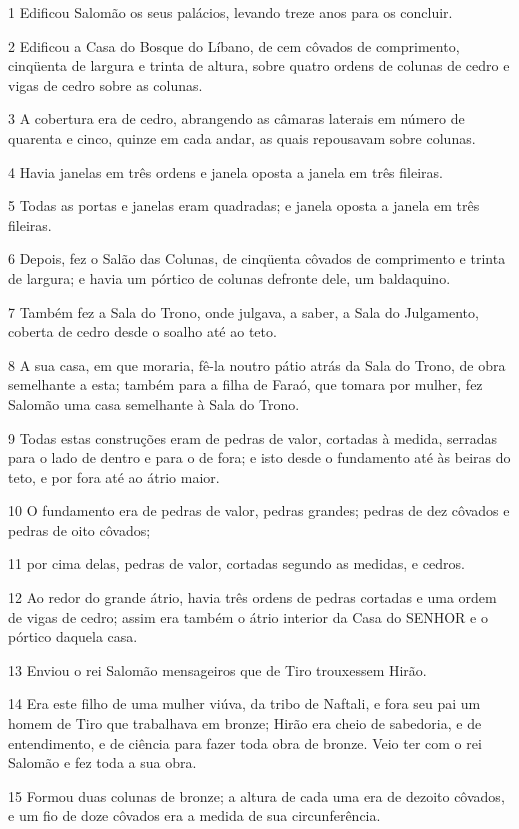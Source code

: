 \par 1 Edificou Salomão os seus palácios, levando treze anos para os concluir.
\par 2 Edificou a Casa do Bosque do Líbano, de cem côvados de comprimento, cinqüenta de largura e trinta de altura, sobre quatro ordens de colunas de cedro e vigas de cedro sobre as colunas.
\par 3 A cobertura era de cedro, abrangendo as câmaras laterais em número de quarenta e cinco, quinze em cada andar, as quais repousavam sobre colunas.
\par 4 Havia janelas em três ordens e janela oposta a janela em três fileiras.
\par 5 Todas as portas e janelas eram quadradas; e janela oposta a janela em três fileiras.
\par 6 Depois, fez o Salão das Colunas, de cinqüenta côvados de comprimento e trinta de largura; e havia um pórtico de colunas defronte dele, um baldaquino.
\par 7 Também fez a Sala do Trono, onde julgava, a saber, a Sala do Julgamento, coberta de cedro desde o soalho até ao teto.
\par 8 A sua casa, em que moraria, fê-la noutro pátio atrás da Sala do Trono, de obra semelhante a esta; também para a filha de Faraó, que tomara por mulher, fez Salomão uma casa semelhante à Sala do Trono.
\par 9 Todas estas construções eram de pedras de valor, cortadas à medida, serradas para o lado de dentro e para o de fora; e isto desde o fundamento até às beiras do teto, e por fora até ao átrio maior.
\par 10 O fundamento era de pedras de valor, pedras grandes; pedras de dez côvados e pedras de oito côvados;
\par 11 por cima delas, pedras de valor, cortadas segundo as medidas, e cedros.
\par 12 Ao redor do grande átrio, havia três ordens de pedras cortadas e uma ordem de vigas de cedro; assim era também o átrio interior da Casa do SENHOR e o pórtico daquela casa.
\par 13 Enviou o rei Salomão mensageiros que de Tiro trouxessem Hirão.
\par 14 Era este filho de uma mulher viúva, da tribo de Naftali, e fora seu pai um homem de Tiro que trabalhava em bronze; Hirão era cheio de sabedoria, e de entendimento, e de ciência para fazer toda obra de bronze. Veio ter com o rei Salomão e fez toda a sua obra.
\par 15 Formou duas colunas de bronze; a altura de cada uma era de dezoito côvados, e um fio de doze côvados era a medida de sua circunferência.
